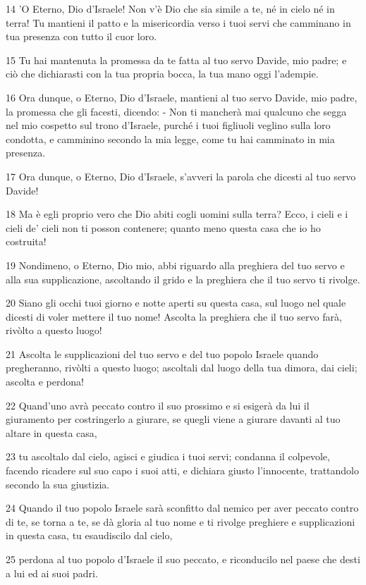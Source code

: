 \par 14 'O Eterno, Dio d'Israele! Non v'è Dio che sia simile a te, né in cielo né in terra! Tu mantieni il patto e la misericordia verso i tuoi servi che camminano in tua presenza con tutto il cuor loro.
\par 15 Tu hai mantenuta la promessa da te fatta al tuo servo Davide, mio padre; e ciò che dichiarasti con la tua propria bocca, la tua mano oggi l'adempie.
\par 16 Ora dunque, o Eterno, Dio d'Israele, mantieni al tuo servo Davide, mio padre, la promessa che gli facesti, dicendo: - Non ti mancherà mai qualcuno che segga nel mio cospetto sul trono d'Israele, purché i tuoi figliuoli veglino sulla loro condotta, e camminino secondo la mia legge, come tu hai camminato in mia presenza.
\par 17 Ora dunque, o Eterno, Dio d'Israele, s'avveri la parola che dicesti al tuo servo Davide!
\par 18 Ma è egli proprio vero che Dio abiti cogli uomini sulla terra? Ecco, i cieli e i cieli de' cieli non ti posson contenere; quanto meno questa casa che io ho costruita!
\par 19 Nondimeno, o Eterno, Dio mio, abbi riguardo alla preghiera del tuo servo e alla sua supplicazione, ascoltando il grido e la preghiera che il tuo servo ti rivolge.
\par 20 Siano gli occhi tuoi giorno e notte aperti su questa casa, sul luogo nel quale dicesti di voler mettere il tuo nome! Ascolta la preghiera che il tuo servo farà, rivòlto a questo luogo!
\par 21 Ascolta le supplicazioni del tuo servo e del tuo popolo Israele quando pregheranno, rivòlti a questo luogo; ascoltali dal luogo della tua dimora, dai cieli; ascolta e perdona!
\par 22 Quand'uno avrà peccato contro il suo prossimo e si esigerà da lui il giuramento per costringerlo a giurare, se quegli viene a giurare davanti al tuo altare in questa casa,
\par 23 tu ascoltalo dal cielo, agisci e giudica i tuoi servi; condanna il colpevole, facendo ricadere sul suo capo i suoi atti, e dichiara giusto l'innocente, trattandolo secondo la sua giustizia.
\par 24 Quando il tuo popolo Israele sarà sconfitto dal nemico per aver peccato contro di te, se torna a te, se dà gloria al tuo nome e ti rivolge preghiere e supplicazioni in questa casa, tu esaudiscilo dal cielo,
\par 25 perdona al tuo popolo d'Israele il suo peccato, e riconducilo nel paese che desti a lui ed ai suoi padri.

